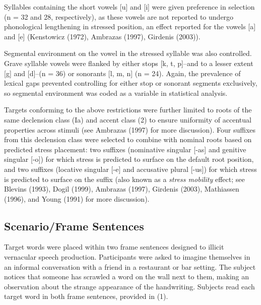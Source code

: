 \documentclass[english,man]{apa6}
\theoremstyle{definition}
\theoremstyle{definition}
\theoremstyle{definition}
\theoremstyle{remark}
\begin{document}
Syllables containing the short vowels {[}u{]} and {[}i{]} were given
preference in selection (n = 32 and 28, respectively), as these vowels
are not reported to undergo phonological lengthening in stressed
position, an effect reported for the vowels {[}a{]} and {[}e{]}
(Kenstowicz (1972), Ambrazas (1997), Girdenis (2003)).

Segmental environment on the vowel in the stressed syllable was also
controlled. Grave syllable vowels were flanked by either stops {[}k, t,
p{]}--and to a lesser extent {[}g{]} and {[}d{]}--(n = 36) or sonorants
{[}l, m, n{]} (n = 24). Again, the prevalence of lexical gaps prevented
controlling for either stop or sonorant segments exclusively, so
segmental environment was coded as a variable in statistical analysis.

Targets conforming to the above restrictions were further limited to
roots of the same declension class (Ia) and accent class (2) to ensure
uniformity of accentual properties across stimuli (see Ambrazas (1997)
for more discussion). Four suffixes from this declension class were
selected to combine with nominal roots based on predicted stress
placement: two suffixes (nominative singular {[}-as{]} and genitive
singular {[}-o{]}) for which stress is predicted to surface on the
default root position, and two suffixes (locative singular {[}-e{]} and
accusative plural {[}-us{]}) for which stress is predicted to surface on
the suffix (also known as a \emph{stress mobility} effect; see Blevins
(1993), Dogil (1999), Ambrazas (1997), Girdenis (2003), Mathiassen
(1996), and Young (1991) for more discussion).

\subsection{Scenario/Frame Sentences}\label{scenarioframe-sentences}

Target words were placed within two frame sentences designed to illicit
vernacular speech production. Participants were asked to imagine
themselves in an informal conversation with a friend in a restaurant or
bar setting. The subject notices that someone has scrawled a word on the
wall next to them, making an observation about the strange appearance of
the handwriting. Subjects read each target word in both frame sentences,
provided in (1).

\newpage
\end{document}
